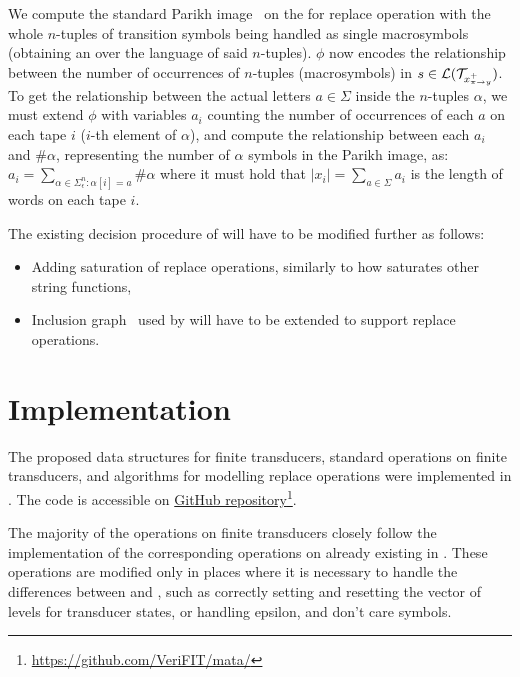 We compute the standard Parikh image~\cite{DBLP:conf/icalp/SeidlSMH04} on the \nft for replace operation with the whole $n$-tuples of transition symbols being handled as single macrosymbols (obtaining an \nfa over the language of said $n$-tuples).
$\phi$ now encodes the relationship between the number of occurrences of $n$-tuples (macrosymbols) in $s \in \mathcal{L}(\mathcal{T}_{x^{+}_{\pi \rightarrow y}})$.
To get the relationship between the actual letters $a \in \Sigma$ inside the $n$-tuples $\alpha$, we must extend $\phi$ with variables $a_i$ counting the number of occurrences of each $a$ on each tape $i$ ($i$-th element of $\alpha$), and compute the relationship between each $a_i$ and $\#\alpha$, representing the number of $\alpha$ symbols in the Parikh image, as: $a_i = \sum_{\alpha \in \Sigma^n_{\epsilon}: \alpha[i] = a} \#\alpha$ where it must hold that $|x_i| = \sum_{a \in \Sigma} a_i $ is the length of words on each tape $i$.

The existing decision procedure of \noodler will have to be modified further as follows:
\begin{itemize}
  \item Adding saturation of replace operations, similarly to how \noodler saturates other string functions,
  \item Inclusion graph~\cite{fm23_equations_synergy_regular_constraints_DBLP:conf/fm/BlahoudekCCHHLS23} used by \noodler will have to be extended to support replace operations.
\end{itemize}

\chapter{Implementation}

The proposed data structures for finite transducers, standard operations on finite transducers, and algorithms for modelling replace operations were implemented in \mata.
The code is accessible on \mata \href{https://github.com/VeriFIT/mata/}{GitHub repository}\footnote{\url{https://github.com/VeriFIT/mata/}}.

The majority of the operations on finite transducers closely follow the implementation of the corresponding operations on \nfas already existing in \mata.
These operations are modified only in places where it is necessary to handle the differences between \nfas and \nfts, such as correctly setting and resetting the vector of levels for transducer states, or handling epsilon, \nop and don't care symbols.

